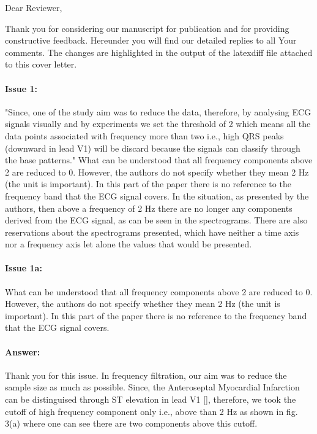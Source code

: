 \documentclass{article}
\begin{document}
Dear Reviewer,

\vspace{0.25in}

Thank you for considering our manuscript for publication and for providing constructive feedback.
Hereunder you will find our detailed replies to all Your comments.
The changes are highlighted in the output of the latexdiff file attached to this cover letter.


\paragraph{Issue 1:}
\begin{displayquote}
"Since, one of the study aim was to reduce the data, therefore, by analysing ECG signals visually and by experiments we set the threshold of 2 which means all the data points associated with frequency more than two i.e., high QRS peaks (downward in lead V1) will be discard because the signals can classify through the base patterns." What can be understood that all frequency components above 2 are reduced to 0. However, the authors do not specify whether they mean 2 Hz (the unit is important). In this part of the paper there is no reference to the frequency band that the ECG signal covers. In the situation, as presented by the authors, then above a frequency of 2 Hz there are no longer any components derived from the ECG signal, as can be seen in the spectrograms. There are also reservations about the spectrograms presented, which have neither a time axis nor a frequency axis let alone the values that would be presented.
\end{displayquote}


\paragraph{Issue 1a:}
\begin{displayquote}
What can be understood that all frequency components above 2 are reduced to 0. However, the authors do not specify whether they mean 2 Hz (the unit is important). In this part of the paper there is no reference to the frequency band that the ECG signal covers.
\end{displayquote}

\paragraph{Answer:}
Thank you for this issue. In frequency filtration, our aim was to reduce the sample size as much as possible. Since, the Anteroseptal Myocardial Infarction can be distinguised through ST elevation in lead V1 [], therefore, we took the cutoff of high frequency component only i.e., above than 2 Hz as shown in fig. 3(a) where one can see there are two components above this cutoff. 
\end{document}
